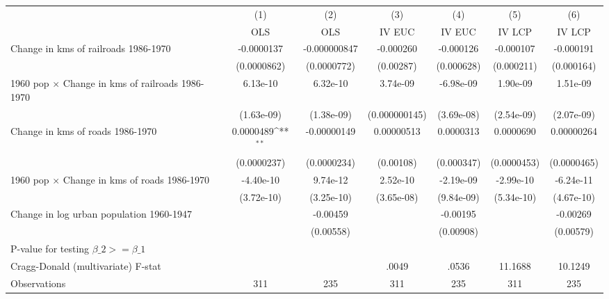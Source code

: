 {
\def\sym#1{\ifmmode^{#1}\else\(^{#1}\)\fi}
\begin{tabular}{l*{6}{c}}
\hline\hline
                &\multicolumn{1}{c}{(1)}&\multicolumn{1}{c}{(2)}&\multicolumn{1}{c}{(3)}&\multicolumn{1}{c}{(4)}&\multicolumn{1}{c}{(5)}&\multicolumn{1}{c}{(6)}\\
                &\multicolumn{1}{c}{OLS}&\multicolumn{1}{c}{OLS}&\multicolumn{1}{c}{IV EUC}&\multicolumn{1}{c}{IV EUC}&\multicolumn{1}{c}{IV LCP}&\multicolumn{1}{c}{IV LCP}\\
\hline
Change in kms of railroads 1986-1970&-0.0000137         &-0.000000847         &-0.000260         &-0.000126         &-0.000107         &-0.000191         \\
                &(0.0000862)         &(0.0000772)         &(0.00287)         &(0.000628)         &(0.000211)         &(0.000164)         \\
[1em]
1960 pop $\times$ Change in kms of railroads 1986-1970& 6.13e-10         & 6.32e-10         & 3.74e-09         &-6.98e-09         & 1.90e-09         & 1.51e-09         \\
                &(1.63e-09)         &(1.38e-09)         &(0.000000145)         &(3.69e-08)         &(2.54e-09)         &(2.07e-09)         \\
[1em]
Change in kms of roads 1986-1970&0.0000489\sym{**} &-0.00000149         &0.00000513         &0.0000313         &0.0000690         &0.00000264         \\
                &(0.0000237)         &(0.0000234)         &(0.00108)         &(0.000347)         &(0.0000453)         &(0.0000465)         \\
[1em]
1960 pop $\times$ Change in kms of roads 1986-1970&-4.40e-10         & 9.74e-12         & 2.52e-10         &-2.19e-09         &-2.99e-10         &-6.24e-11         \\
                &(3.72e-10)         &(3.25e-10)         &(3.65e-08)         &(9.84e-09)         &(5.34e-10)         &(4.67e-10)         \\
[1em]
Change in log urban population 1960-1947&                  & -0.00459         &                  & -0.00195         &                  & -0.00269         \\
                &                  &(0.00558)         &                  &(0.00908)         &                  &(0.00579)         \\
\hline
P-value for testing $\beta\_{2} >= \beta\_{1}$&                  &                  &                  &                  &                  &                  \\
Cragg-Donald (multivariate) F-stat&                  &                  &    .0049         &    .0536         &  11.1688         &  10.1249         \\
Observations    &      311         &      235         &      311         &      235         &      311         &      235         \\
\hline\hline
\end{tabular}
}
